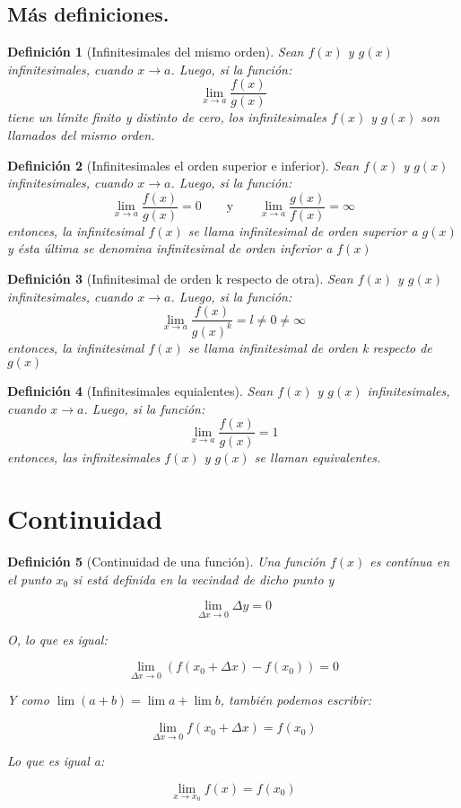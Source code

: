 \documentclass[12pt,a4paper]{extarticle}
\newtheorem{mydef}{Definici\'on}[section]
\begin{document}
\subsection{M\'as definiciones.}
\begin{mydef}[Infinitesimales del mismo orden]
Sean $f(x)$ y $g(x)$ infinitesimales, cuando $x \to a$. Luego, si la
funci\'on:
\[\lim_{x \to a}\frac{f(x)}{g(x)}\]
tiene un l\'imite finito y distinto de cero, los infinitesimales
$f(x)$ y $g(x)$ son llamados \emph{del mismo orden}.
\end{mydef}
\begin{mydef}[Infinitesimales el orden superior e inferior]
Sean $f(x)$ y $g(x)$ infinitesimales, cuando $x \to a$. Luego, si la
funci\'on:
\[\lim_{x \to a}\frac{f(x)}{g(x)}=0\qquad\text{y}\qquad\lim_{x \to a}\frac{g(x)}{f(x)}=\infty\]
entonces, la infinitesimal $f(x)$ se llama \emph{infinitesimal de
  orden superior a} $g(x)$ y \'esta \'ultima se denomina
\emph{infinitesimal de orden inferior a} $f(x)$
\end{mydef}

\begin{mydef}[Infinitesimal de orden k respecto de otra]
Sean $f(x)$ y $g(x)$ infinitesimales, cuando $x \to a$. Luego, si la
funci\'on:
\[\lim_{x \to a}\frac{f(x)}{g(x)^k}=l\neq0\neq\infty\]
entonces, la infinitesimal $f(x)$ se llama \emph{infinitesimal de
  orden k respecto de} $g(x)$
\end{mydef}


\begin{mydef}[Infinitesimales equialentes]
Sean $f(x)$ y $g(x)$ infinitesimales, cuando $x \to a$. Luego, si la
funci\'on:
\[\lim_{x \to a}\frac{f(x)}{g(x)}=1\]
entonces, las infinitesimales $f(x)$ y $g(x)$ se llaman
\emph{equivalentes}.
\end{mydef}

\section{Continuidad}

\begin{mydef}[Continuidad de una funci\'on]

Una funci\'on \( f(x) \) es \emph{cont\'inua} en el punto \( x_0 \) si
est\'a definida en la vecindad de dicho punto y

\[ \lim_{\Delta x \to 0} \Delta y = 0 \]

O, lo que es igual:


\[ \lim_{\Delta x \to 0} (f(x_0+\Delta x)-f(x_0)) = 0 \]

Y como \( \lim(a+b) = \lim a + \lim b \), tambi\'en podemos escribir:

\[ \lim_{\Delta x \to 0} f(x_0+ \Delta x) = f(x_0) \]

Lo que es igual a:

\[ \lim_{x \to x_0} f(x) = f(x_0) \]



\end{mydef}
\end{document}
